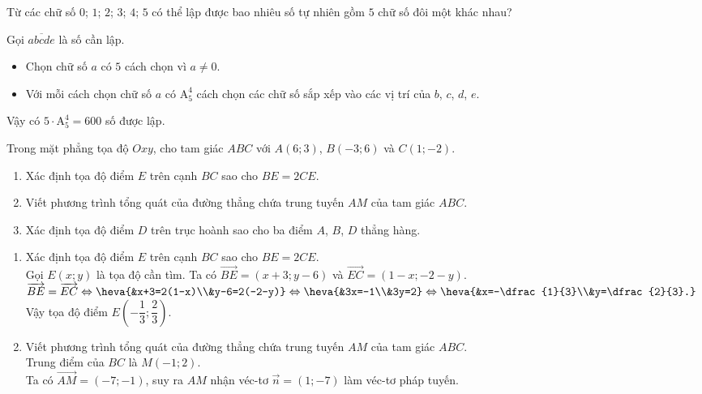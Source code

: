 \begin{bt}%
	Từ các chữ số $0$; $1$; $2$; $3$; $4$; $5$ có thể lập được bao nhiêu số tự nhiên gồm $5$ chữ số đôi một khác nhau?
	\loigiai
	{
		Gọi $\overline{abcde}$ là số cần lập.
		\begin{itemize}
			\item Chọn chữ số $a$ có $5$ cách chọn vì $a\ne 0$.
			\item Với mỗi cách chọn chữ số $a$ có $\mathrm{A}_5^4$ cách chọn các chữ số sắp xếp vào các vị trí của $b$, $c$, $d$, $e$.
		\end{itemize}
		Vậy có $5\cdot \mathrm{A}_5^4=600$ số được lập.
	}
\end{bt}
\begin{bt}%
	Trong mặt phẳng tọa độ $Oxy$, cho tam giác $ABC$ với $A(6;3)$, $B(-3;6)$ và $C(1;-2)$.
	\begin{enumerate}
		\item Xác định tọa độ điểm $E$ trên cạnh $BC$ sao cho $BE=2CE$.
		\item Viết phương trình tổng quát của đường thẳng chứa trung tuyến $AM$ của tam giác $ABC$.
		\item Xác định tọa độ điểm $D$ trên trục hoành sao cho ba điểm $A$, $B$, $D$ thẳng hàng.
	\end{enumerate}
	\loigiai
	{
	\begin{enumerate}
	\item Xác định tọa độ điểm $E$ trên cạnh $BC$ sao cho $BE=2CE$.\\
	Gọi $E(x;y)$ là tọa độ cần tìm. Ta có $\overrightarrow{BE}=(x+3;y-6)$ và $\overrightarrow{EC}=(1-x;-2-y)$.\\
	$\overrightarrow{BE}=\overrightarrow{EC}\Leftrightarrow\heva{&x+3=2(1-x)\\&y-6=2(-2-y)}\Leftrightarrow\heva{&3x=-1\\&3y=2}\Leftrightarrow\heva{&x=-\dfrac{1}{3}\\&y=\dfrac{2}{3}.}$\\
	Vậy tọa độ điểm $E\left(-\dfrac{1}{3};\dfrac{2}{3}\right)$.
	\item Viết phương trình tổng quát của đường thẳng chứa trung tuyến $AM$ của tam giác $ABC$.\\
	Trung điểm của $BC$ là $M(-1;2)$.\\
	Ta có $\overrightarrow{AM}=(-7;-1)$, suy ra $AM$ nhận véc-tơ $\overrightarrow{n}=(1;-7)$ làm véc-tơ pháp tuyến.\\

\end{enumerate}}
\end{bt}
